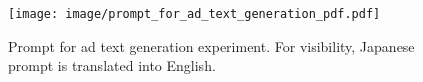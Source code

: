 \begin{figure}[t]
 \centering
  \texttt{[image: image/prompt\_for\_ad\_text\_generation\_pdf.pdf]}
 \caption{Prompt for ad text generation experiment. For visibility, Japanese prompt is translated into English.}
 \label{fig:prompt_for_ad_text_generation}
\end{figure}